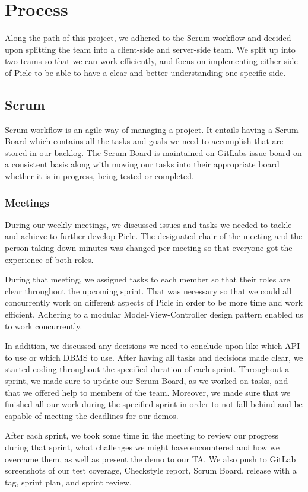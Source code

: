 \chapter{Process}\label{ch:process}

Along the path of this project, we adhered to the Scrum workflow and decided upon splitting
the team into a client-side and server-side team. We split up into two teams so that we
can work efficiently, and focus on implementing either side of Picle to be able to have
a clear and better understanding one specific side.

\section{Scrum}
Scrum workflow is an agile way of managing a project. It entails having a Scrum Board
which contains all the tasks and goals we need to accomplish that are stored in our backlog.
The Scrum Board is maintained on GitLabs issue board on a consistent basis along with
moving our tasks into their appropriate board whether it is in progress, being tested or
completed.

\subsection{Meetings}
During our weekly meetings, we discussed issues and tasks we needed to tackle and achieve
to further develop Picle. The designated chair of the meeting and the person taking down
minutes was changed per meeting so that everyone got the experience of both roles.

During that meeting, we assigned tasks to each member so that their roles are clear throughout
the upcoming sprint. That was necessary so that we could all concurrently work on different
aspects of Picle in order to be more time and work efficient. Adhering to a modular
Model-View-Controller design pattern enabled us to work concurrently.

In addition, we discussed any decisions we need to conclude upon like which API to use or
which DBMS to use. After having all tasks and decisions made clear, we started coding
throughout the specified duration of each sprint. Throughout a sprint, we made sure to
update our Scrum Board, as we worked on tasks, and that we offered help to members of the team.
Moreover, we made sure that we finished all our work during the specified sprint in order
to not fall behind and be capable of meeting the deadlines for our demos.

After each sprint, we took some time in the meeting to review our progress during that
sprint, what challenges we might have encountered and how we overcame them, as well as
present the demo to our TA. We also push to GitLab screenshots of our test coverage,
Checkstyle report, Scrum Board, release with a tag, sprint plan, and sprint review.

